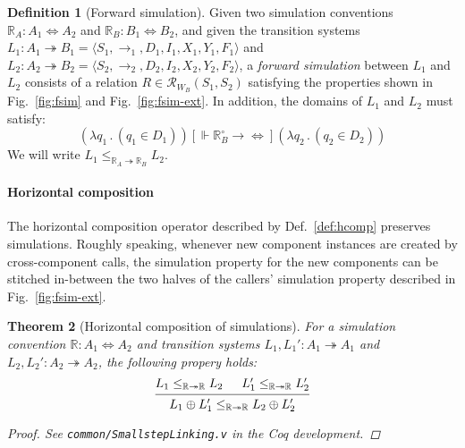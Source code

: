 \documentclass[11pt,oneside,draft]{book}
\newtheorem{theorem}{Theorem}[chapter]
\theoremstyle{definition}
\newtheorem{definition}[theorem]{Definition}
\newcommand{\ifr}[1]{\mathrel{[{#1}]}}
\newcommand{\que}{\circ}         %
\begin{document}
\begin{definition}[Forward simulation] \label{def:fsim} %
Given
two simulation conventions
$\mathbb{R}_A : A_1 \Leftrightarrow A_2$ and
$\mathbb{R}_B : B_1 \Leftrightarrow B_2$,
and given
the transition systems
$L_1 : A_1 \twoheadrightarrow B_1 = \langle S_1, {\rightarrow}_1, D_1, I_1, X_1, Y_1, F_1 \rangle$ and
$L_2 : A_2 \twoheadrightarrow B_2 = \langle S_2, {\rightarrow}_2, D_2, I_2, X_2, Y_2, F_2 \rangle$,
a \emph{forward simulation} between $L_1$ and $L_2$
consists of a relation
$R \in \mathcal{R}_{W_B}(S_1, S_2)$
satisfying the properties shown in
Fig.~\ref{fig:fsim} and Fig.~\ref{fig:fsim-ext}.
In addition, the domains of $L_1$ and $L_2$
must satisfy:
\[
  (\lambda q_1 \, . \, (q_1 \in D_1))
  \ifr{\Vdash \mathbb{R}_B^\que \rightarrow {\Leftrightarrow}}
  (\lambda q_2 \, . \, (q_2 \in D_2))
\]
We will write $L_1 \le_{\mathbb{R}_A \twoheadrightarrow \mathbb{R}_B} L_2$.
\end{definition}


\paragraph{Horizontal composition} %

The horizontal composition operator
described by Def.~\ref{def:hcomp}
preserves simulations.
Roughly speaking,
whenever new component instances are created
by cross-component calls,
the simulation property for the new components
can be stitched in-between
the two halves of the callers' simulation property
described in Fig.~\ref{fig:fsim-ext}.

\begin{theorem}[Horizontal composition of simulations] \label{thm:fsim-hcomp} %
For a simulation convention
$\mathbb{R} : A_1 \Leftrightarrow A_2$
and transition systems
$L_1, L_1' : A_1 \twoheadrightarrow A_1$ and
$L_2, L_2' : A_2 \twoheadrightarrow A_2$,
the following propery holds:
\[
  \begin{prooftree}
    \hypo{L_1 \le_{\mathbb{R} \twoheadrightarrow \mathbb{R}} L_2}
    \hypo{L_1' \le_{\mathbb{R} \twoheadrightarrow \mathbb{R}} L_2'}
    \infer2{L_1 \oplus L_1'
      \le_{\mathbb{R} \twoheadrightarrow \mathbb{R}}
      L_2 \oplus L_2'}
  \end{prooftree}
\]
\begin{proof}
See \texttt{common/SmallstepLinking.v}
in the Coq development.
\end{proof}
\end{theorem}
\end{document}
